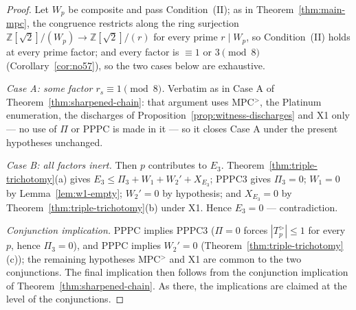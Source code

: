 \documentclass[11pt]{amsart}
\theoremstyle{plain}
\theoremstyle{definition}
\theoremstyle{remark}
\numberwithin{equation}{section}
\newcommand{\Z}{\mathbb{Z}}
\begin{document}
\begin{proof}
Let $W_p$ be composite and pass Condition~(II); as in Theorem~\ref{thm:main-mpc}, the congruence restricts along the ring surjection $\Z[\sqrt 2]/(W_p) \to \Z[\sqrt 2]/(r)$ for every prime $r \mid W_p$, so Condition~(II) holds at every prime factor; and every factor is $\equiv 1$ or $3 \pmod 8$ (Corollary~\ref{cor:no57}), so the two cases below are exhaustive.

\emph{Case A: some factor $r_s \equiv 1 \pmod 8$.} Verbatim as in Case A of Theorem~\ref{thm:sharpened-chain}: that argument uses MPC$^{>}$, the Platinum enumeration, the discharges of Proposition~\ref{prop:witness-discharges} and X1 only --- no use of $\Pi$ or PPPC is made in it --- so it closes Case A under the present hypotheses unchanged.

\emph{Case B: all factors inert.} Then $p$ contributes to $E_3$. Theorem~\ref{thm:triple-trichotomy}(a) gives $E_3 \leq \Pi_3 + W_1 + W_2' + X_{E_3}$; PPPC3 gives $\Pi_3 = 0$; $W_1 = 0$ by Lemma~\ref{lem:w1-empty}; $W_2' = 0$ by hypothesis; and $X_{E_3} = 0$ by Theorem~\ref{thm:triple-trichotomy}(b) under X1. Hence $E_3 = 0$ --- contradiction.

\emph{Conjunction implication.} PPPC implies PPPC3 ($\Pi = 0$ forces $|T_p^{>}| \leq 1$ for every $p$, hence $\Pi_3 = 0$), and PPPC implies $W_2' = 0$ (Theorem~\ref{thm:triple-trichotomy}(c)); the remaining hypotheses MPC$^{>}$ and X1 are common to the two conjunctions. The final implication then follows from the conjunction implication of Theorem~\ref{thm:sharpened-chain}. As there, the implications are claimed at the level of the conjunctions.
\end{proof}
\end{document}
